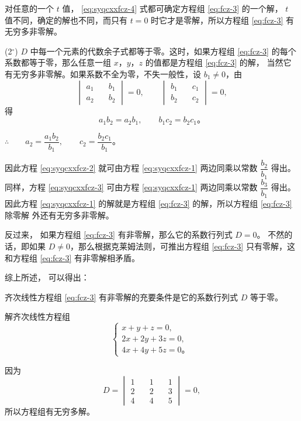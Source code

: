 对任意的一个 $t$ 值， \eqref{eq:syqcxxfcz-4} 式都可确定方程组 \eqref{eq:fcz-3} 的一个解，
$t$ 值不同，确定的解也不同，而只有 $t = 0$ 时它才是零解，所以方程组 \eqref{eq:fcz-3} 有无穷多非零解。


(2$^\circ$)  $D$ 中每一个元素的代数余子式都等于零。这时，如果方程组 \eqref{eq:fcz-3}
的每个系数都等于零，那么任意一组 $x$，$y$，$z$ 的值都是方程组 \eqref{eq:fcz-3} 的解，
当然它有无穷多非零解。如果系数不全为零，不失一般性，设 $b_1 \neq 0$，由
$$\begin{vmatrix*}
    a_1 \quad & b_1 \\
    a_2 \quad & b_2
\end{vmatrix*} = 0, \qquad
\begin{vmatrix*}
    b_1 \quad & c_1 \\
    b_2 \quad & c_2
\end{vmatrix*} = 0,
$$
得
$$a_1b_2 = a_2b_1, \qquad b_1c_2 = b_2c_1 \text{。}$$

$\therefore \qquad a_2 = \dfrac{a_1b_2}{b_1}, \qquad c_2 = \dfrac{b_2c_1}{b_1} \text{。}$

因此方程 \eqref{eq:syqcxxfcz-2} 就可由方程 \eqref{eq:syqcxxfcz-1} 两边同乘以常数 $\dfrac{b_2}{b_1}$ 得出。
同样，方程 \eqref{eq:syqcxxfcz-3} 可由方程 \eqref{eq:syqcxxfcz-1} 两边同乘以常数 $\dfrac{b_3}{b_1}$ 得出。
因此方程 \eqref{eq:syqcxxfcz-1} 的解就是方程组 \eqref{eq:fcz-3} 的解，所以方程组 \eqref{eq:fcz-3} 除零解
外还有无穷多非零解。

反过来， 如果方程组 \eqref{eq:fcz-3} 有非零解，那么它的系数行列式 $D = 0$。
不然的话，即如果 $D \neq 0$，那么根据克莱姆法则，可推出方程组 \eqref{eq:fcz-3}
只有零解，这和方程组 \eqref{eq:fcz-3} 有非零解相矛盾。

综上所述， 可以得出：

\begin{theorem}\label{theorem:syqcxxfcz-1}
    齐次线性方程组 \eqref{eq:fcz-3} 有非零解的充要条件是它的系数行列式 $D$ 等于零。
\end{theorem}


\liti 解齐次线性方程组
$$\begin{cases}
    x + y + z = 0, \\
    2x + 2y + 3z = 0, \\
    4x + 4y + 5z = 0 \text{。}
\end{cases}$$

\jie 因为
$$D = \begin{vmatrix*}
	1 \quad & 1 \quad & 1 \\
	2 \quad & 2 \quad & 3 \\
	4 \quad & 4 \quad & 5
\end{vmatrix*} = 0,$$
所以方程组有无穷多解。

